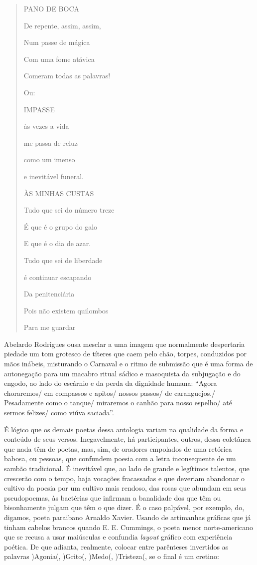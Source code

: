 \documentclass[
  letterpaper,
  DIV=11,
  numbers=noendperiod]{scrreprt}
\begin{document}
\begin{quote}
PANO DE BOCA~

De repente, assim, assim,~

Num passe de mágica~

Com uma fome atávica~

Comeram todas as palavras!~

Ou:~

IMPASSE~

às vezes a vida~

me passa de reluz~

como um imenso~

e inevitável funeral.~

ÀS MINHAS CUSTAS~

Tudo que sei do número treze~

É que é o grupo do galo~

E que é o dia de azar.~

Tudo que sei de liberdade~

é continuar escapando~

Da penitenciária~

Pois não existem quilombos~

Para me guardar
\end{quote}

Abelardo Rodrigues ousa mesclar a uma imagem que normalmente despertaria
piedade um tom grotesco de títeres que caem pelo chão, torpes,
conduzidos por mãos inábeis, misturando o Carnaval e o ritmo de
submissão que é uma forma de autonegação para um macabro ritual sádico e
masoquista da subjugação e do engodo, ao lado do escárnio e da perda da
dignidade humana: ``Agora choraremos/ em compassos e apitos/ nossos
passos/ de caranguejos./ Pesadamente como o tanque/ miraremos o canhão
para nosso espelho/ até sermos felizes/ como viúva saciada''.

É lógico que os demais poetas dessa antologia variam na qualidade da
forma e conteúdo de seus versos. Inegavelmente, há participantes,
outros, dessa coletânea que nada têm de poetas, mas, sim, de oradores
empolados de uma retórica babosa, ou pessoas, que confundem poesia com a
letra inconsequente de um sambão tradicional. É inevitável que, ao lado
de grande e legítimos talentos, que crescerão com o tempo, haja vocações
fracassadas e que deveriam abandonar o cultivo da poesia por um cultivo
mais rendoso, das rosas que abundam em seus pseudopoemas, às bactérias
que infirmam a banalidade dos que têm ou bisonhamente julgam que têm o
que dizer. É o caso palpável, por exemplo, do, digamos, poeta paraibano
Arnaldo Xavier. Usando de artimanhas gráficas que já tinham cabelos
brancos quando E. E. Cummings, o poeta menor norte-americano que se
recusa a usar maiúsculas e confundia \emph{layout} gráfico com
experiência poética. De que adianta, realmente, colocar entre parênteses
invertidos as palavras )Agonia(, )Grito(, )Medo(, )Tristeza(, se o final
é um cretino:
\end{document}
